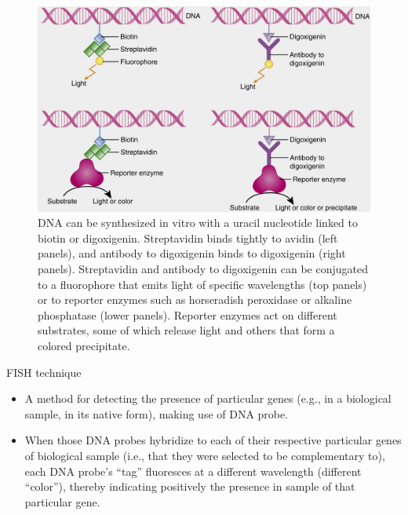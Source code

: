 \documentclass[11pt,dvipsnames,ignorenonframetext,aspectratio=169]{beamer}
\providecommand{\tightlist}{%
  \setlength{\itemsep}{0pt}\setlength{\parskip}{0pt}}
\begin{document}
\begin{frame}{}
\protect\hypertarget{section-3}{}
\begin{figure}

{\centering \includegraphics[width=0.7\linewidth]{../images/fluorescent_labelling} 

}

\caption{DNA can be synthesized in vitro with a uracil nucleotide linked to biotin or digoxigenin. Streptavidin binds tightly to avidin (left panels), and antibody to digoxigenin binds to digoxigenin (right panels). Streptavidin and antibody to digoxigenin can be conjugated to a fluorophore that emits light of specific wavelengths (top panels) or to reporter enzymes such as horseradish peroxidase or alkaline phosphatase (lower panels). Reporter enzymes act on different substrates, some of which release light and others that form a colored precipitate.}\label{fig:fluorescent-tags}
\end{figure}
\end{frame}

\begin{frame}{FISH technique}
\protect\hypertarget{fish-technique}{}
\begin{itemize}
\tightlist
\item
  A method for detecting the presence of particular genes (e.g., in a
  biological sample, in its native form), making use of DNA probe.
\item
  When those DNA probes hybridize to each of their respective particular
  genes of biological sample (i.e., that they were selected to be
  complementary to), each DNA probe's ``tag'' fluoresces at a different
  wavelength (different ``color''), thereby indicating positively the
  presence in sample of that particular gene.
\end{itemize}
\end{frame}
\end{document}
